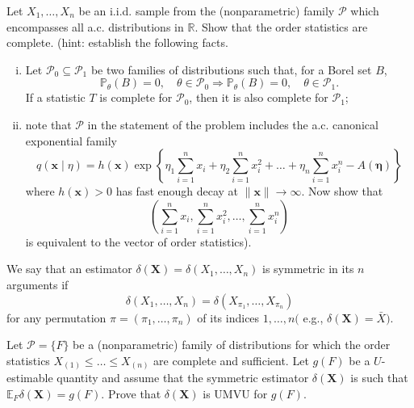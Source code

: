 \begin{exercise}
    Let \(X_{1}, \ldots, X_{n}\) be an i.i.d. sample from the (nonparametric) family \(\mathcal{P}\) which encompasses all a.c. distributions in \(\mathbb{R}\). Show that the order statistics are complete. (hint: establish the following facts. 
    \begin{enumerate}[(i)]
        \item Let \(\mathcal{P}_{0} \subseteq \mathcal{P}_{1}\) be two families of distributions such that, for a Borel set \(B\),
        \[
        \mathbb{P}_{\theta}(B)=0, \quad \theta \in \mathcal{P}_{0} \Rightarrow \mathbb{P}_{\theta}(B)=0, \quad \theta \in \mathcal{P}_{1} .
        \]
        If a statistic \(T\) is complete for \(\mathcal{P}_{0}\), then it is also complete for \(\mathcal{P}_{1}\); 
        \item note that \(\mathcal{P}\) in the statement of the problem includes the a.c. canonical exponential family
        \[
        q(\mathbf{x} \mid \eta)=h(\mathbf{x}) \exp \left\{\eta_{1} \sum_{i=1}^{n} x_{i}+\eta_{2} \sum_{i=1}^{n} x_{i}^{2}+\ldots+\eta_{n} \sum_{i=1}^{n} x_{i}^{n}-A(\boldsymbol{\eta})\right\}
        \]
        where \(h(\mathbf{x})>0\) has fast enough decay at \(\|\mathbf{x}\| \rightarrow \infty\). Now show that
        \[
        \left(\sum_{i=1}^{n} x_{i}, \sum_{i=1}^{n} x_{i}^{2}, \ldots, \sum_{i=1}^{n} x_{i}^{n}\right)
        \]
        is equivalent to the vector of order statistics). 
    \end{enumerate}
\end{exercise}


\begin{exercise}
    We say that an estimator \(\delta(\mathbf{X})=\delta\left(X_{1}, \ldots, X_{n}\right)\) is symmetric in its \(n\) arguments if
    \[
    \delta\left(X_{1}, \ldots, X_{n}\right)=\delta\left(X_{\pi_{1}}, \ldots, X_{\pi_{n}}\right)
    \]
    for any permutation \(\pi=\left(\pi_{1}, \ldots, \pi_{n}\right)\) of its indices \(1, \ldots, n(\) e.g., \(\delta(\mathbf{X})=\bar{X})\). 

    Let \(\mathcal{P}=\{F\}\) be a (nonparametric) family of distributions for which the order statistics \(X_{(1)} \leq \ldots \leq X_{(n)}\) are complete and sufficient. Let \(g(F)\) be a \(U\)-estimable quantity and assume that the symmetric estimator \(\delta(\mathbf{X})\) is such that \(\mathbb{E}_{F} \delta(\mathbf{X})=g(F)\). Prove that \(\delta(\mathbf{X})\) is UMVU for \(g(F)\). 
\end{exercise}


